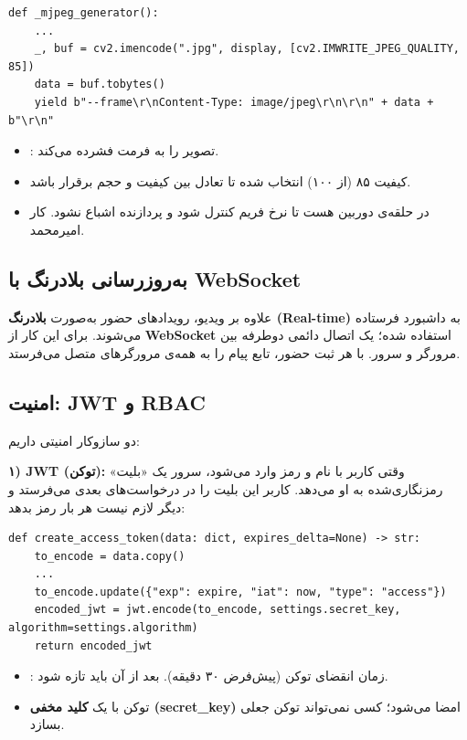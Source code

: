 \documentclass[12pt,a4paper]{article}
\begin{document}
\begin{latin}
\begin{lstlisting}
def _mjpeg_generator():
    ...
    _, buf = cv2.imencode(".jpg", display, [cv2.IMWRITE_JPEG_QUALITY, 85])
    data = buf.tobytes()
    yield b"--frame\r\nContent-Type: image/jpeg\r\n\r\n" + data + b"\r\n"
\end{lstlisting}
\end{latin}
\begin{itemize}[rightmargin=0pt]
  \item {}: تصویر را به فرمت  فشرده می‌کند.
  \item کیفیت ۸۵ (از ۱۰۰) انتخاب شده تا تعادل بین کیفیت و حجم برقرار باشد.
  \item در حلقه‌ی دوربین  هست تا نرخ فریم کنترل شود و پردازنده اشباع نشود. کار امیرمحمد.
\end{itemize}

\subsection{به‌روزرسانی بلادرنگ با WebSocket}
علاوه بر ویدیو، رویدادهای حضور به‌صورت \textbf{بلادرنگ (Real-time)} به داشبورد فرستاده می‌شوند. برای این کار از \textbf{WebSocket} استفاده شده؛ یک اتصال دائمی دو‌طرفه بین مرورگر و سرور. با هر ثبت حضور، تابع  پیام را به همه‌ی مرورگرهای متصل می‌فرستد.

\subsection{امنیت: JWT و RBAC}
دو سازوکار امنیتی داریم:

\textbf{۱) JWT (توکن):} وقتی کاربر با نام و رمز وارد می‌شود، سرور یک «بلیت» رمزنگاری‌شده به او می‌دهد. کاربر این بلیت را در درخواست‌های بعدی می‌فرستد و دیگر لازم نیست هر بار رمز بدهد:

\begin{latin}
\begin{lstlisting}
def create_access_token(data: dict, expires_delta=None) -> str:
    to_encode = data.copy()
    ...
    to_encode.update({"exp": expire, "iat": now, "type": "access"})
    encoded_jwt = jwt.encode(to_encode, settings.secret_key, algorithm=settings.algorithm)
    return encoded_jwt
\end{lstlisting}
\end{latin}
\begin{itemize}[rightmargin=0pt]
  \item {}: زمان انقضای توکن (پیش‌فرض ۳۰ دقیقه). بعد از آن باید تازه شود.
  \item توکن با یک \textbf{کلید مخفی (secret\_key)} امضا می‌شود؛ کسی نمی‌تواند توکن جعلی بسازد.
\end{itemize}
\end{document}
